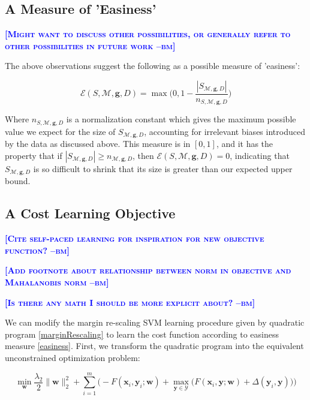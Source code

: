\documentclass{article} %
\newcommand{\bmcomment}[1]{\textcolor{blue}{\textsc{\textbf{[#1 --bm]}}}}
\begin{document}
\subsection{A Measure of 'Easiness'}

\bmcomment{Might want to discuss other possibilities, or generally
refer to other possibilities in future work}

The above observations suggest the following as a possible 
measure of 'easiness':

\begin{equation}
\label{easiness}
\mathcal{E}(S,\mathcal{M},\mathbf{g},D)=\max\bigg(0, 1-\frac{|S_{\mathcal{M},\mathbf{g},D}|}{n_{S,\mathcal{M},\mathbf{g},D}}\bigg)
\end{equation}

Where $n_{S,\mathcal{M},\mathbf{g},D}$ is a normalization constant which
gives the maximum possible value we expect for the size of 
$S_{\mathcal{M},\mathbf{g},D}$, accounting for irrelevant biases
introduced by the data as discussed above.  This measure is in
$[0,1]$, and it has the property that if 
$|S_{\mathcal{M},\mathbf{g},D}|\geq n_{\mathcal{M},\mathbf{g},D}$,
then $\mathcal{E}(S,\mathcal{M},\mathbf{g},D)=0$, indicating that
$S_{\mathcal{M},\mathbf{g},D}$ is so difficult to shrink that its
size is greater than our expected upper bound.

\subsection{A Cost Learning Objective}

\bmcomment{Cite self-paced learning for inspiration for new objective function?}

\bmcomment{Add footnote about relationship between norm in objective and
Mahalanobis norm}

\bmcomment{Is there any math I should be more explicit about?}

We can modify the margin re-scaling SVM learning procedure given by 
quadratic program \ref{marginRescaling} to learn the cost function 
according to easiness measure \ref{easiness}.
First, we transform the quadratic program
into the equivalent unconstrained optimization problem:

\begin{equation}
\label{svmObjective}
\min_{\mathbf{w}} \frac{\lambda_2}{2}\|\mathbf{w}\|_2^2 + \sum_{i=1}^m\bigg(-F(\mathbf{x}_i,\mathbf{y}_i;\mathbf{w})+\max_{\mathbf{y}\in \mathcal{Y}}\Big(F(\mathbf{x}_i,\mathbf{y};\mathbf{w})+\Delta(\mathbf{y}_i,\mathbf{y})\Big)\bigg)
\end{equation}
\end{document}
